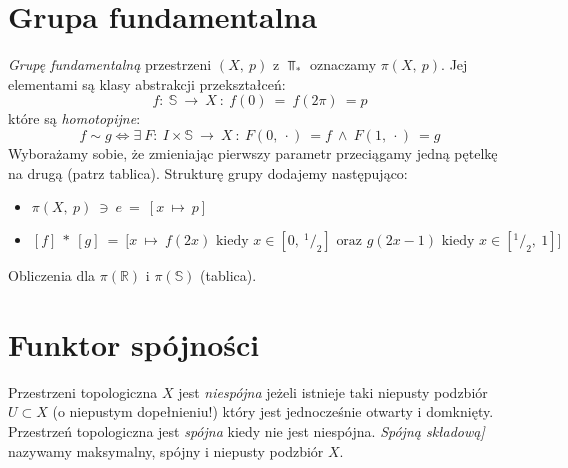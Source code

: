 \section{Grupa fundamentalna}
\emph{Grupę  fundamentalną} przestrzeni $(X,\ p)$ z $\Top_*$ oznaczamy $\pi(X,\ p)$. Jej elementami są klasy abstrakcji przekształceń:
$$f:\ \mathbb{S}\ \to\ X\ :\ f(0)\ =\  f(2\pi)\ = p$$
które są \emph{homotopijne}:
$$f \sim g \iff \exists\ F:\ I \times \mathbb{S}\ \to\ X\ :\ F(0,\ \cdot)\ = f\ \wedge\ F(1,\ \cdot)\ = g$$
Wyborażamy sobie, że zmieniając pierwszy parametr przeciągamy jedną pętelkę na drugą (patrz tablica).
Strukturę grupy dodajemy następująco:
\begin{itemize}
	\item $\pi(X,\ p)\ \ni\ e\ =\ [x\ \mapsto\ p]$
	\item $[f]\ *\ [g]\ =\ \bigg[x\ \mapsto\ f(2x)\text{ kiedy }x \in [0,\ ^1/_2]\text{ oraz }g(2x-1)\text{ kiedy }x \in [^1/_2,\ 1]\bigg]$
\end{itemize}




\begin{example}
	Obliczenia dla $\pi(\mathbb{R})$ i $\pi(\mathbb{S})$ (tablica).
\end{example}




\section{Funktor spójności}
Przestrzeni topologiczna $X$ jest \emph{niespójna} jeżeli istnieje taki niepusty podzbiór $U\subset X$ (o niepustym dopełnieniu!) który jest jednocześnie otwarty i domknięty. Przestrzeń topologiczna jest \emph{spójna} kiedy nie jest niespójna.
\emph{Spójną składową]} nazywamy maksymalny, spójny i niepusty podzbiór $X$.

